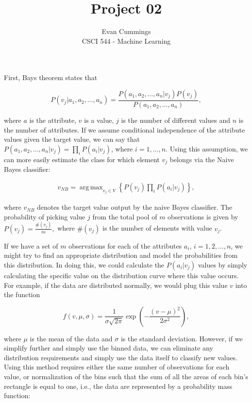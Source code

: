 
\DeclareMathOperator*{\argmax}{arg\,max}

\usepackage[top=.5in, bottom=.5in, left=.5in, right=.5in]{geometry}


\small

\title{Project 02}
\author{Evan Cummings\\
CSCI 544 - Machine Learning}

\maketitle

First, Bays theorem states that

$$ P(v_j | a_1, a_2, \ldots, a_n) = \frac{P(a_1, a_2, \ldots, a_n | v_j) P(v_j)}{P(a_1,a_2,\ldots,a_n)},$$

where $a$ is the attribute, $v$ is a value, $j$ is the number of different values and $n$ is the number of attributes.  If we assume conditional independence of the attribute values given the target value, we can say that $P(a_1, a_2, \ldots, a_n | v_j) = \prod_i P(a_i | v_j)$, where $i = 1,\ldots,n$.  Using this assumption, we can more easily estimate the class for which element $v_j$ belongs via the Naive Bayes classifier:

\begin{align}
  v_{NB} = \argmax_{v_j \in V}\left\{ P(v_j) \prod_i P(a_i | v_j) \right\},
\end{align}

where $v_{NB}$ denotes the target value output by the naive Bayes classifier.  The probability of picking value $j$ from the total pool of $m$ observations is given by $P(v_j) = \frac{\#(v_j)}{m},$ where $\#(v_j)$ is the number of elements with value $v_j$.

If we have a set of $m$ observations for each of the attributes $a_i$, $i = 1,2,\ldots,n$, we might try to find an appropriate distribution and model the probabilities from this distribution.  In doing this, we could calculate the $P(a_i | v_j)$ values by simply calculating the specific value on the distribution curve where this value occurs.  For example, if the data are distributed normally, we would plug this value $v$ into the function

$$f(v,\mu, \sigma) = \frac{1}{\sigma \sqrt{2\pi}} \exp\left( -\frac{(v-\mu)^2}{2\sigma^2} \right),$$

where $\mu$ is the mean of the data and $\sigma$ is the standard deviation.  However, if we simplify further and simply use the binned data, we can eliminate any distribution requirements and simply use the data itself to classify new values.  Using this method requires either the same number of observations for each value, or normalization of the bins such that the sum of all the areas of each bin's rectangle is equal to one, i.e., the data are represented by a probability mass function:

